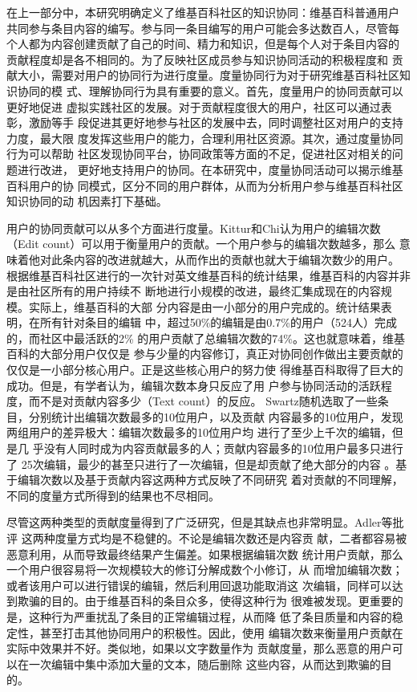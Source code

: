 在上一部分中，本研究明确定义了维基百科社区的知识协同：维基百科普通用户
共同参与条目内容的编写。参与同一条目编写的用户可能会多达数百人，尽管每
个人都为内容创建贡献了自己的时间、精力和知识，但是每个人对于条目内容的
贡献程度却是各不相同的。为了反映社区成员参与知识协同活动的积极程度和
贡献大小，需要对用户的协同行为进行度量。度量协同行为对于研究维基百科社区知识协同的模
式、理解协同行为具有重要的意义。首先，度量用户的协同贡献可以更好地促进
虚拟实践社区的发展。对于贡献程度很大的用户，社区可以通过表彰，激励等手
段促进其更好地参与社区的发展中去，同时调整社区对用户的支持力度，最大限
度发挥这些用户的能力，合理利用社区资源。其次，通过度量协同行为可以帮助
社区发现协同平台，协同政策等方面的不足，促进社区对相关的问题进行改进，
更好地支持用户的协同。在本研究中，度量协同活动可以揭示维基百科用户的协
同模式，区分不同的用户群体，从而为分析用户参与维基百科社区知识协同的动
机因素打下基础。

用户的协同贡献可以从多个方面进行度量。Kittur和Chi认为用户的编辑次数
（Edit count）可以用于衡量用户的贡献\cite{Kittur2007}。一个用户参与的编辑次数越多，那么
意味着他对此条内容的改进就越大，从而作出的贡献也就大于编辑次数少的用户。
根据维基百科社区进行的一次针对英文维基百科的统计结果，维基百科的内容并非是由社区所有的用户持续不
断地进行小规模的改进，最终汇集成现在的内容规模。实际上，维基百科的大部
分内容是由一小部分的用户完成的。统计结果表明，在所有针对条目的编辑
中，超过50\%的编辑是由0.7\%的用户（524人）完成的，而社区中最活跃的2\%
的用户贡献了总编辑次数的74\%。这也就意味着，维基百科的大部分用户仅仅是
参与少量的内容修订，真正对协同创作做出主要贡献的仅仅是一小部分核心用户。正是这些核心用户的努力使
 得维基百科取得了巨大的成功。但是，有学者认为，编辑次数本身只反应了用
 户参与协同活动的活跃程度，而不是对贡献内容多少（Text count）的反应。
 Swartz随机选取了一些条目，分别统计出编辑次数最多的10位用户，以及贡献
 内容最多的10位用户，发现两组用户的差异极大：编辑次数最多的10位用户均
 进行了至少上千次的编辑，但是几
 乎没有人同时成为内容贡献最多的人；贡献内容最多的10位用户最多只进行了
 25次编辑，最少的甚至只进行了一次编辑，但是却贡献了绝大部分的内容
 \cite{aswartz}。基于编辑次数以及基于贡献内容这两种方式反映了不同研究
 着对贡献的不同理解，不同的度量方式所得到的结果也不尽相同。

尽管这两种类型的贡献度量得到了广泛研究，但是其缺点也非常明显。Adler等批评
 这两种度量方式均是不稳健的\cite{Adler2008}。不论是编辑次数还是内容贡
 献，二者都容易被恶意利用，从而导致最终结果产生偏差。如果根据编辑次数
 统计用户贡献，那么一个用户很容易将一次规模较大的修订分解成数个小修订，从
 而增加编辑次数；或者该用户可以进行错误的编辑，然后利用回退功能取消这
 次编辑，同样可以达到欺骗的目的。由于维基百科的条目众多，使得这种行为
 很难被发现。更重要的是，这种行为严重扰乱了条目的正常编辑过程，从而降
 低了条目质量和内容的稳定性，甚至打击其他协同用户的积极性。因此，使用
 编辑次数来衡量用户贡献在实际中效果并不好。类似地，如果以文字数量作为
 贡献度量，那么恶意的用户可以在一次编辑中集中添加大量的文本，随后删除
 这些内容，从而达到欺骗的目的。

